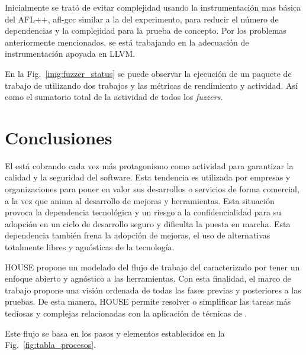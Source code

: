 \documentclass[10pt,conference,a4paper]{IEEEtran}
\begin{document}
Inicialmente se trató de evitar complejidad usando la instrumentación mas básica del AFL++, afl-gcc similar a la del experimento, para reducir el número de dependencias y la complejidad para la prueba de concepto. Por los problemas anteriormente mencionados, se está trabajando en la adecuación de instrumentación apoyada en LLVM.




En la Fig.~\ref{img:fuzzer_status} se puede observar la ejecución de un paquete de trabajo de {\fz} utilizando dos trabajos y las métricas de rendimiento y actividad. Así como el sumatorio total de la actividad de todos los \textit{fuzzers}.

\section{Conclusiones}
\label{Conclusiones}

El {\fz} está cobrando cada vez más protagonismo como actividad para garantizar la calidad y la seguridad del software. Esta tendencia es utilizada por empresas y organizaciones para poner en valor sus desarrollos o servicios de forma comercial, a la vez que anima al desarrollo de mejoras y herramientas. Esta situación provoca la dependencia tecnológica y un riesgo a la confidencialidad para su adopción en un ciclo de desarrollo seguro y dificulta la puesta en marcha. Esta dependencia también frena la adopción de mejoras, el uso de alternativas totalmente libres y agnósticas de la tecnología.

HOUSE propone un modelado del flujo de trabajo del {\fz} caracterizado por tener un enfoque abierto y agnóstico a las herramientas. Con esta finalidad, el marco de trabajo propone una visión ordenada de todas las fases previas y posteriores a las pruebas. De esta manera, HOUSE permite resolver o simplificar las tareas más tediosas y complejas relacionadas con la aplicación de técnicas de {\fz}.

Este flujo se basa en los pasos y elementos establecidos en la Fig.~\ref{fig:tabla_procesos}.


\end{document}
